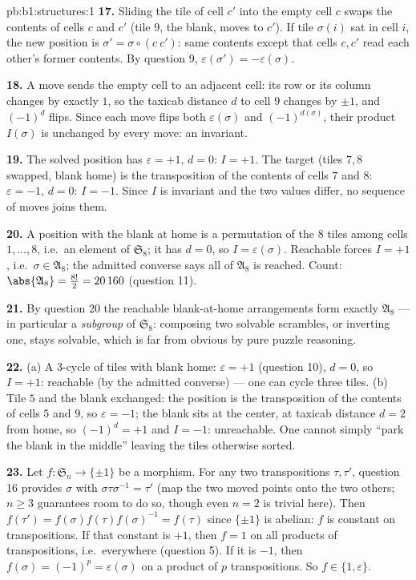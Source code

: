 \begin{solution}{pb:b1:structures:1}
\textbf{17.} Sliding the tile of cell $c'$ into the empty cell
$c$ swaps the contents of cells $c$ and $c'$ (tile $9$, the
blank, moves to $c'$). If tile $\sigma(i)$ sat in cell $i$, the
new position is $\sigma' = \sigma \circ (c\ c')$: same contents
except that cells $c, c'$ read each other's former contents. By
question 9, $\varepsilon(\sigma') = -\varepsilon(\sigma)$.

\textbf{18.} A move sends the empty cell to an adjacent cell: its
row or its column changes by exactly $1$, so the taxicab distance
$d$ to cell $9$ changes by $\pm1$, and $(-1)^d$ flips. Since each
move flips both $\varepsilon(\sigma)$ and $(-1)^{d(\sigma)}$,
their product $I(\sigma)$ is unchanged by every move: an
invariant.

\textbf{19.} The solved position has $\varepsilon = +1$, $d = 0$:
$I = +1$. The target (tiles $7, 8$ swapped, blank home) is the
transposition of the contents of cells $7$ and $8$: $\varepsilon
= -1$, $d = 0$: $I = -1$. Since $I$ is invariant and the two
values differ, no sequence of moves joins them.

\textbf{20.} A position with the blank at home is a permutation
of the $8$ tiles among cells $1, \dots, 8$, i.e.\ an element of
$\mathfrak S_8$; it has $d = 0$, so $I = \varepsilon(\sigma)$.
Reachable forces $I = +1$, i.e.\ $\sigma \in \mathfrak A_8$; the
admitted converse says all of $\mathfrak A_8$ is reached. Count:
$\abs{\mathfrak A_8} = \frac{8!}2 = 20\,160$ (question 11).

\textbf{21.} By question 20 the reachable blank-at-home
arrangements form exactly $\mathfrak A_8$ --- in particular a
\emph{subgroup} of $\mathfrak S_8$: composing two solvable
scrambles, or inverting one, stays solvable, which is far from
obvious by pure puzzle reasoning.

\textbf{22.} (a) A $3$-cycle of tiles with blank home:
$\varepsilon = +1$ (question 10), $d = 0$, so $I = +1$: reachable
(by the admitted converse) --- one can cycle three tiles.
(b) Tile $5$ and the blank exchanged: the position is the
transposition of the contents of cells $5$ and $9$, so
$\varepsilon = -1$; the blank sits at the center, at taxicab
distance $d = 2$ from home, so $(-1)^d = +1$ and $I = -1$:
unreachable. One cannot simply ``park the blank in the middle''
leaving the tiles otherwise sorted.

\textbf{23.} Let $f \colon \mathfrak S_n \to \{\pm1\}$ be a
morphism. For any two transpositions $\tau, \tau'$, question 16
provides $\sigma$ with $\sigma\tau\sigma^{-1} = \tau'$ (map the
two moved points onto the two others; $n \geq 3$ guarantees room
to do so, though even $n = 2$ is trivial here). Then $f(\tau') =
f(\sigma)f(\tau)f(\sigma)^{-1} = f(\tau)$ since $\{\pm1\}$ is
abelian: $f$ is constant on transpositions. If that constant is
$+1$, then $f = 1$ on all products of transpositions, i.e.\
everywhere (question 5). If it is $-1$, then $f(\sigma) =
(-1)^p = \varepsilon(\sigma)$ on a product of $p$ transpositions.
So $f \in \{1, \varepsilon\}$.


\end{solution}
